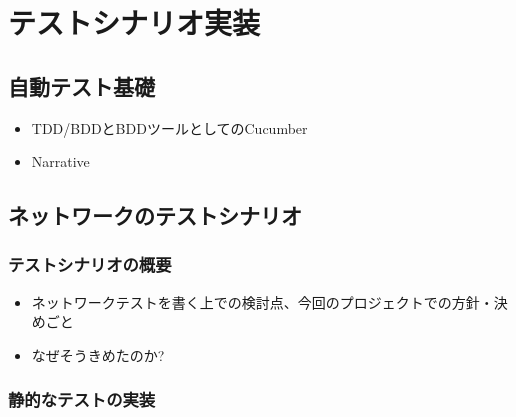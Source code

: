 
\chapter{テストシナリオ実装}
\label{chap:poc-scenario-dev}

\section{自動テスト基礎}

\begin{itemize}
 \item TDD/BDDとBDDツールとしてのCucumber
 \item Narrative
\end{itemize}

\section{ネットワークのテストシナリオ}

\subsection{テストシナリオの概要}

\begin{itemize}
 \item ネットワークテストを書く上での検討点、今回のプロジェクトでの方針・決めごと
 \item なぜそうきめたのか?
\end{itemize}

\subsection{静的なテストの実装}

